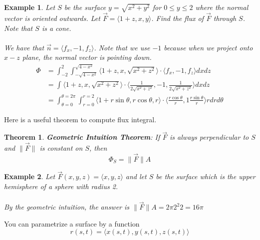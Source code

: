 \documentclass[11pt]{article}
\newtheorem{thm}{Theorem}
\newtheorem{ex}{Example}
\begin{document}
\begin{ex}
  Let $S$ be the surface $y = \sqrt{x^{2}+y^{2}}$ for $0 \le y \le 2$ where the normal vector is oriented outwards. Let $\vec{F} = \langle 1+z, x, y \rangle$.
  Find the flux of $\vec{F}$ through $S$. Note that $S$ is a cone.
  \\
  \\
  We have that $\vec{n} = \langle f_{x}, -1, f_{z} \rangle$. Note that we use $-1$ because when we project onto $x-z$ plane, the normal vector is pointing down.
  \begin{align*}
    \Phi
    &= \int_{-2}^{2} \int_{-\sqrt{4-x^{2}}}^{\sqrt{4-x^{2}}}\langle 1+z, x , \sqrt{x^{2}+z^{2}} \rangle \cdot \langle f_{x}, -1, f_{z} \rangle dxdz\\
    &= \int_{} \langle 1+z, x , \sqrt{x^{2}+z^{2}} \rangle \cdot \langle \frac{1}{2\sqrt{x^{2}+z^{2}}}, -1, \frac{1}{2\sqrt{x^{2}+z^{2}}} \rangle dxdz\\
      &= \int_{\theta= 0}^{\theta = 2\pi}\int_{r=0}^{r=2} \langle 1+r\sin\theta, r\cos\theta, r \rangle \cdot \langle \frac{r\cos\theta}{r},1 \frac{r\sin\theta}{r} \rangle rdrd\theta
   \end{align*}
  \end{ex}


  Here is a useful theorem to compute flux integral.
  \begin{thm}
    \textbf{Geometric Intuition Theorem}: If $\vec{F}$ is always perpendicular to $S$ and $\|\vec{F}\|$ is constant
    on $S$, then
    \[\Phi_{S} = \|\vec{F}\|A\]

    \end{thm}

    \begin{ex}
      Let $\vec{F}(x,y,z) = \langle x,y,z \rangle$ and let $S$ be the surface which is the upper hemisphere of a sphere with radius 2.\\

    \\
      By the geometric intuition, the answer is $\|\vec{F}\|A = 2\pi2^{2}2 = 16\pi$
      \end{ex}

      You can parametrize a surface by a function
      \[r(s,t) = \langle x(s,t), y(s,t), z(s,t) \rangle \]
\end{document}
